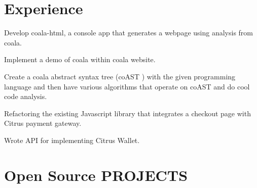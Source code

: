 \documentclass[]{deedy-resume-openfont}
\begin{document}
\begin{minipage}[t]{0.66\textwidth} 


\section{Experience}

\vspace{\topsep} 
\begin{tightemize}
\item Develop coala-html, a console app that generates a webpage using analysis from coala. \end{tightemize}
\begin{tightemize}
\item Implement a demo of coala within coala website.\end{tightemize}
\begin{tightemize}
\item Create a coala abstract syntax tree (coAST ) with the given programming language and then have various algorithms that operate on coAST and do cool code analysis.\end{tightemize}
\sectionsep

\vspace{\topsep} 
\begin{tightemize}
\item Refactoring the existing Javascript library that integrates a checkout page with Citrus payment gateway.\end{tightemize}
\begin{tightemize}
\item Wrote API for implementing Citrus Wallet.\end{tightemize}
\sectionsep




\section{Open Source PROJECTS}


\end{minipage}
\end{document}
